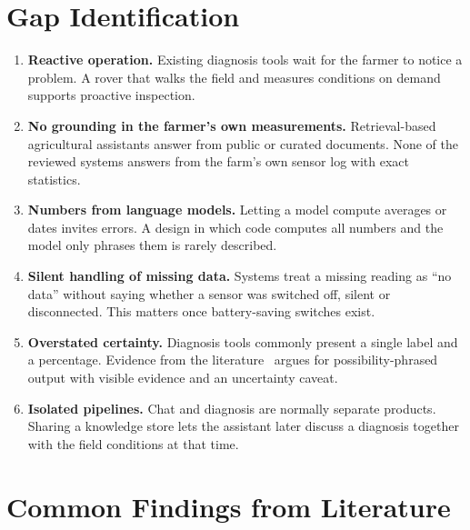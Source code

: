 \section{Gap Identification}

\begin{enumerate}[label=G\arabic*.]
\item \textbf{Reactive operation.} Existing diagnosis tools wait for the farmer to notice a problem. A rover that walks the
      field and measures conditions on demand supports proactive inspection.
\item \textbf{No grounding in the farmer's own measurements.} Retrieval-based agricultural assistants answer from public
      or curated documents. None of the reviewed systems answers from the farm's own sensor log with exact statistics.
\item \textbf{Numbers from language models.} Letting a model compute averages or dates invites errors. A design in which code
      computes all numbers and the model only phrases them is rarely described.
\item \textbf{Silent handling of missing data.} Systems treat a missing reading as ``no data'' without saying whether a
      sensor was switched off, silent or disconnected. This matters once battery-saving switches exist.
\item \textbf{Overstated certainty.} Diagnosis tools commonly present a single label and a percentage. Evidence from the
      literature~\cite{guo2017calibration,nguyen2026leafnet} argues for possibility-phrased output with visible evidence and
      an uncertainty caveat.
\item \textbf{Isolated pipelines.} Chat and diagnosis are normally separate products. Sharing a knowledge store lets the
      assistant later discuss a diagnosis together with the field conditions at that time.
\end{enumerate}

\section{Common Findings from Literature}

